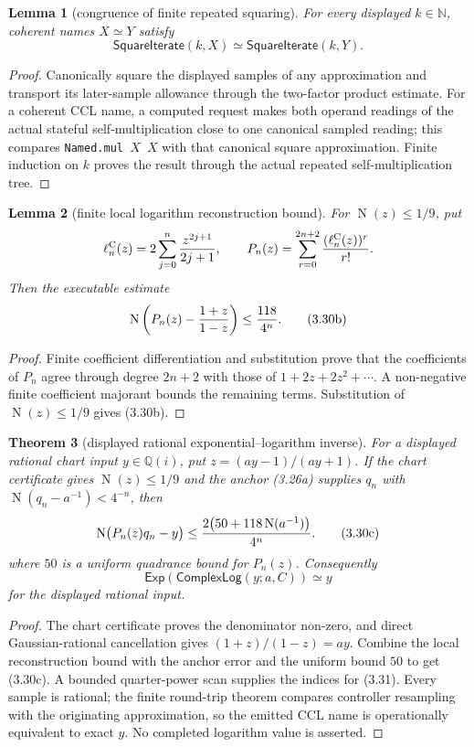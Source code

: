 \documentclass[10pt]{article}
\newtheorem{theorem}{Theorem}[section]
\newtheorem{lemma}[theorem]{Lemma}
\theoremstyle{definition}
\theoremstyle{remark}
\newcommand{\N}{\mathbb{N}}
\newcommand{\Qi}{\mathbb{Q}(i)}
\newcommand{\Norm}{\operatorname{N}}
\begin{document}
\begin{lemma}[congruence of finite repeated squaring]
For every displayed $k\in\N$, coherent names $X\simeq Y$ satisfy
\[
 \mathsf{SquareIterate}(k,X)\simeq
 \mathsf{SquareIterate}(k,Y).
\tag{3.30d}
\]
\end{lemma}

\begin{proof}
Canonically square
the displayed samples of any approximation and transport its later-sample
allowance through the two-factor product estimate.  For a coherent CCL name,
a computed request makes both operand readings of the actual stateful
self-multiplication close to one canonical sampled reading; this compares
\texttt{Named.mul $X$ $X$} with that canonical square approximation.  Finite
induction on $k$ proves the result through the actual repeated
self-multiplication tree.
\end{proof}

\begin{lemma}[finite local logarithm reconstruction bound]
For $\Norm(z)\le1/9$, put
\[
 \ell_n^{\mathrm C}(z)=2\sum_{j=0}^n{z^{2j+1}\over2j+1},
 \qquad
 P_n(z)=\sum_{r=0}^{2n+2}{(\ell_n^{\mathrm C}(z))^r\over r!}.
\]
Then the executable estimate
\[
 \Norm\left(P_n(z)-{1+z\over1-z}\right)
 \le {118\over4^n}.
\tag{3.30b}
\]
\end{lemma}

\begin{proof}
Finite coefficient differentiation and substitution prove that the
coefficients of $P_n$ agree through degree $2n+2$ with those of
$1+2z+2z^2+\cdots$.  A non-negative finite coefficient majorant bounds the
remaining terms.  Substitution of $\Norm(z)\le1/9$ gives (3.30b).
\end{proof}

\begin{theorem}[displayed rational exponential--logarithm inverse]
For a displayed rational chart input $y\in\Qi$, put
$z=(ay-1)/(ay+1)$.  If the chart certificate gives $\Norm(z)\le1/9$ and
the anchor (3.26a) supplies $q_n$ with
$\Norm(q_n-a^{-1})<4^{-n}$, then
\[
 \Norm\bigl(P_n(z)q_n-y\bigr)
 \le {2\bigl(50+118\Norm(a^{-1})\bigr)\over4^n}.
 \tag{3.30c}
\]
where $50$ is a uniform quadrance bound for $P_n(z)$.  Consequently
\[
 \mathsf{Exp}(\mathsf{ComplexLog}(y;a,C))\simeq y
\tag{3.31}
\]
for the displayed rational input.
\end{theorem}

\begin{proof}
The chart certificate proves the denominator non-zero, and direct
Gaussian-rational cancellation gives $(1+z)/(1-z)=ay$.  Combine the local
reconstruction bound with the anchor error and the uniform bound $50$ to get
(3.30c).  A bounded quarter-power scan supplies the indices for (3.31).
Every sample is rational; the finite round-trip theorem compares controller
resampling with the originating approximation, so the emitted CCL name is
operationally equivalent to exact $y$.  No completed logarithm value is
asserted.
\end{proof}
\end{document}
